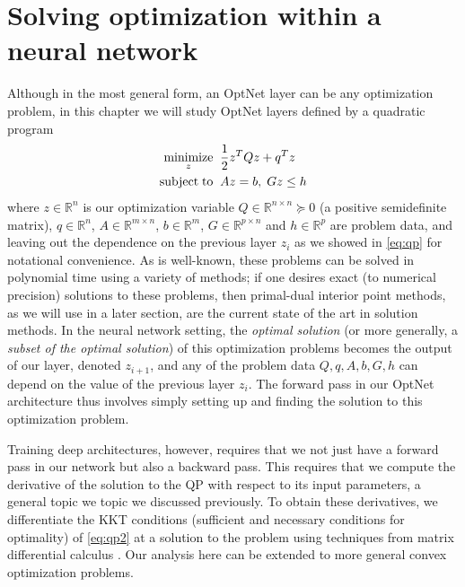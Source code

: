 \section{Solving optimization within a neural network}
\label{sec:optnet:formulation}
Although in the most general form, an OptNet layer can be any
optimization problem, in this chapter we will study OptNet layers defined by a
quadratic program
\begin{equation}
    \begin{split}
        \operatorname*{minimize}_{z} \;\; & \frac{1} {2}z^T Q z + q^T z \\
        \operatorname*{subject\;to} \;\; & A z = b, \; G z \leq h
    \end{split}
    \label{eq:qp2}
\end{equation}
where $z \in \mathbb{R}^n$ is our optimization variable
$Q \in \mathbb {R}^{n \times n} \succeq 0$
(a positive semidefinite matrix),
$q \in \mathbb {R}^n$, $A\in \mathbb{R}^{m \times n}$,
$b \in \mathbb{R}^m$,
$G \in \mathbb{R}^ {p \times n}$ and
$h \in \mathbb{R}^{p}$ are problem data,
and leaving out the dependence on the
previous layer $z_i$ as we showed in \eqref{eq:qp}
for notational convenience.
As is well-known,
these problems can be solved in polynomial time using a variety of methods; if
one desires exact (to numerical precision) solutions to these problems, then
primal-dual interior point methods, as we will use in a later section, are the
current state of the art in solution methods.
In the neural network setting, the \emph{optimal solution} (or more generally,
a \emph{subset of the optimal solution}) of this optimization problems becomes
the output of our layer, denoted $z_{i+1}$, and any of the problem data
$Q, q, A, b, G, h$
can depend on the value of the previous layer $z_i$.
The forward pass in our OptNet architecture thus involves simply setting up
and finding the solution to this optimization problem.

Training deep architectures, however, requires that we not just have a forward
pass in our network but also a backward pass. This requires that we compute the
derivative of the solution to the QP with respect to its input parameters,
a general topic we topic we discussed previously.
To obtain these derivatives, we differentiate the KKT conditions
(sufficient and necessary conditions for optimality) of \eqref{eq:qp2} at a
solution to the problem using techniques
from matrix differential calculus \citep{magnus1988matrix}.
Our analysis here can be extended to
more general convex optimization problems.

